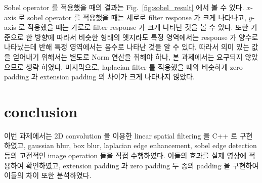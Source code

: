 \documentclass[a4paper, 12p]{paper}
\begin{document}
Sobel operator 를 적용했을 때의 결과는 Fig.~\ref{fig:sobel_result} 에서 볼 수 있다. $x$-axis 로 sobel operator 를 적용했을 때는 세로로 filter response 가 크게 나타나고, $y$-axis 로 적용했을 때는 가로로 filter response 가 크게 나타난 것을 볼 수 있다. 또한 기준으로 한 방향에 따라서 비슷한 형태의 엣지라도 특정 영역에서는 response 가 양수로 나타났는데 반해 특정 영역에서는 음수로 나타난 것을 알 수 있다. 따라서 의미 있는 값을 얻어내기 위해서는 별도로 Norm 연산을 취해야 하나, 본 과제에서는 요구되지 않았으므로 생략 하였다. 마지막으로, laplacian filter 를 적용했을 때와 비슷하게 zero padding 과 extension padding 의 차이가 크게 나타나지 않았다.

\section{conclusion}
이번 과제에서는 2D convolution 을 이용한 linear spatial filtering 을 C++ 로 구현하였고, gaussian blur, box blur, laplacian edge enhancement, sobel edge detection 등의 고전적인 image operation 들을 직접 수행하였다. 이들의 효과를 실제 영상에 적용하여 확인하였고, extension padding 과 zero padding 두 종의 padding 을 구현하여 이들의 차이 또한 분석하였다.
\end{document}
